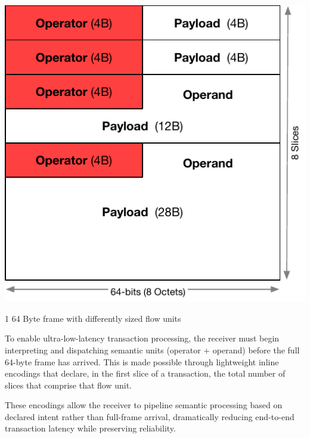 \documentclass[../OAE-SPEC-MAIN.tex]{subfiles}
\begin{document}
\begin{marginfigure}
  \includegraphics[width=\linewidth]{./figures/Mixed-1-2-4-slice-flowtransactions.pdf}
  \caption{1 64 Byte frame with differently sized flow units}
  \vspace{8pt}
\end{marginfigure}



To enable ultra-low-latency transaction processing, the receiver must begin interpreting and dispatching semantic units (operator + operand) before the full 64-byte frame has arrived. This is made possible through lightweight inline encodings that declare, in the first slice of a transaction, the total number of slices that comprise that flow unit.

These encodings allow the receiver to pipeline semantic processing based on declared intent rather than full-frame arrival, dramatically reducing end-to-end transaction latency while preserving reliability.

\end{document}
